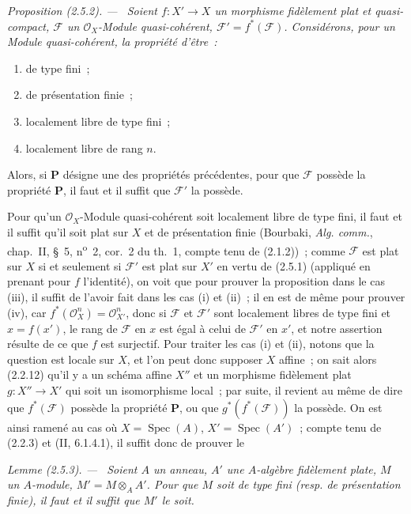 \documentclass[10pt,oneside]{book}
\makeatletter
\newcommand{\oldpage}[2][]{%
  \setcounter{footnote}{0}%
  \marginpar{\scriptsize\textbf{#1}~|~#2}\ignorespaces}
\newenvironment{proposition}[1][]{%
  \par\medskip\noindent\itshape Proposition (#1). ---\ }{\par}
\newenvironment{lemma}[1][]{%
  \par\medskip\noindent\itshape Lemme (#1). ---\ }{\par}
\newcommand{\EGAReaderTarget}[2]{\hypertarget{#1}{}\@bsphack\begingroup\def\@currentHref{#1}\label{#2}\endgroup\@esphack}
\makeatother
\begin{document}
\begin{proposition}[2.5.2]
\EGAReaderTarget{ega4.c04.prop.2-5-2}{IV.2.5.2-fr}
Soient $f:X'\to X$ un morphisme fidèlement plat et quasi-compact,
$\mathscr F$ un $\mathcal O_X$-Module quasi-cohérent,
$\mathscr F'=f^*(\mathscr F)$. Considérons, pour un Module quasi-cohérent, la
propriété d'être~:
\begin{enumerate}
\item[(i)] de type fini~;
\item[(ii)] de présentation finie~;
\item[(iii)] localement libre de type fini~;
\item[(iv)] localement libre de rang $n$.
\end{enumerate}
Alors, si $\mathbf P$ désigne une des propriétés précédentes, pour que
$\mathscr F$ possède la propriété $\mathbf P$, il faut et il suffit que
$\mathscr F'$ la possède.
\end{proposition}

Pour qu'un $\mathcal O_X$-Module quasi-cohérent soit localement libre de type
fini, il faut et il suffit qu'il soit plat sur $X$ et de présentation finie
(Bourbaki, \emph{Alg. comm.}, chap.~II, \S~5, n\textsuperscript{o}~2,
cor.~2 du th.~1, compte tenu de (2.1.2))~; comme $\mathscr F$ est plat sur
$X$ si et seulement si $\mathscr F'$ est plat sur $X'$ en vertu de (2.5.1)
(appliqué en prenant pour $f$ l'identité), on voit que pour prouver la
proposition dans le cas (iii), il suffit de l'avoir fait dans les cas (i) et
(ii)~; il en est de même pour prouver (iv), car
$f^*(\mathcal O_X^n)=\mathcal O_{X'}^n$, donc si $\mathscr F$ et
$\mathscr F'$ sont localement libres de type fini et $x=f(x')$, le rang de
$\mathscr F$ en $x$ est égal à celui de $\mathscr F'$ en $x'$, et notre
assertion résulte de ce que $f$ est surjectif. Pour traiter les cas (i) et
(ii),
\oldpage[IV-2]{23}
notons que la question est locale sur $X$, et l'on peut donc supposer $X$
affine~; on sait alors (2.2.12) qu'il y a un schéma affine $X''$ et un
morphisme fidèlement plat $g:X''\to X'$ qui soit un isomorphisme local~; par
suite, il revient au même de dire que $f^*(\mathscr F)$ possède la propriété
$\mathbf P$, ou que $g^*(f^*(\mathscr F))$ la possède. On est ainsi ramené au
cas où $X=\operatorname{Spec}(A)$, $X'=\operatorname{Spec}(A')$~; compte tenu
de (2.2.3) et (II, 6.1.4.1), il suffit donc de prouver le

\begin{lemma}[2.5.3]
\label{IV.2.5.3-fr}
Soient $A$ un anneau, $A'$ une $A$-algèbre fidèlement plate, $M$ un
$A$-module, $M'=M\otimes_A A'$. Pour que $M$ soit de type fini (resp. de
présentation finie), il faut et il suffit que $M'$ le soit.
\end{lemma}
\end{document}
